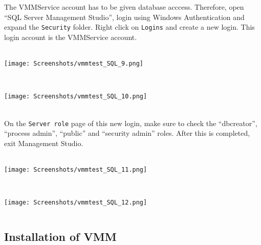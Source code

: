 The VMMService account has to be given database acccess. Therefore, open ``SQL Server Management Studio'', login using Windows Authentication and expand the \texttt{Security} folder. Right click on \texttt{Logins} and create a new login. This login account is the VMMService account.
$\;$ \\ \\
\noindent\begin{minipage}{\textwidth}
    \centering
    \texttt{[image: Screenshots/vmmtest\_SQL\_9.png]}
\end{minipage}
$\;$ \\ \\
\noindent\begin{minipage}{\textwidth}
    \centering
    \texttt{[image: Screenshots/vmmtest\_SQL\_10.png]}
\end{minipage}
$\;$ \\ \\
On the \texttt{Server role} page of this new login, make sure to check the ``dbcreator'', ``process admin'', ``public'' and ``security admin'' roles. After this is completed, exit Management Studio. 
$\;$ \\ \\
\noindent\begin{minipage}{\textwidth}
    \centering
    \texttt{[image: Screenshots/vmmtest\_SQL\_11.png]}
\end{minipage}
$\;$ \\ \\
\noindent\begin{minipage}{\textwidth}
    \centering
    \texttt{[image: Screenshots/vmmtest\_SQL\_12.png]}
\end{minipage}
$\;$ \\

\subsection{Installation of VMM}

